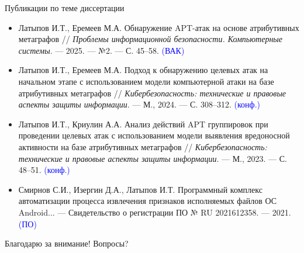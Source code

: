 \begin{frame}{Публикации по теме диссертации}
    \begin{itemize}
        \item Латыпов И.Т., Еремеев М.А. Обнаружение APT-атак на основе атрибутивных метаграфов // \textit{Проблемы информационной безопасности. Компьютерные системы}. — 2025. — №2. — С. 45–58. \hfill \textcolor{blue}{(ВАК)}
        \item Латыпов И.Т., Еремеев М.А. Подход к обнаружению целевых атак на начальном этапе с использованием модели компьютерной атаки на базе атрибутивных метаграфов // \textit{Кибербезопасность: технические и правовые аспекты защиты информации}. — М., 2024. — С. 308–312. \hfill \textcolor{blue}{(конф.)}
        \item Латыпов И.Т., Криулин А.А. Анализ действий APT группировок при проведении целевых атак с использованием модели выявления вредоносной активности на базе атрибутивных метаграфов // \textit{Кибербезопасность: технические и правовые аспекты защиты информации}. — М., 2023. — С. 48–51. \hfill \textcolor{blue}{(конф.)}
        \item Смирнов С.И., Изергин Д.А., Латыпов И.Т. Программный комплекс автоматизации процесса извлечения признаков исполняемых файлов ОС Android... — Свидетельство о регистрации ПО № RU 2021612358. — 2021. \hfill \textcolor{blue}{(ПО)}
    \end{itemize}
\end{frame}

\begin{frame}{Благодарю за внимание!}
  \centering
  \vspace{2cm}
  \Large Вопросы?
\end{frame}


